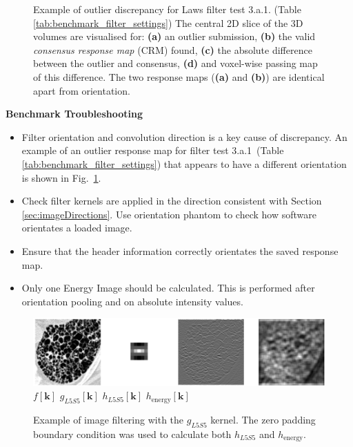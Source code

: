 \documentclass[fleqn,a4paper,oneside,openany]{book}
\begin{document}
\begin{figure}[!t]
\begin{minipage}[b]{0.45\textwidth}
   \end{minipage} 
   \caption{Example of outlier discrepancy for Laws filter test 3.a.1. (Table \ref{tab:benchmark_filter_settings}) The central 2D slice of the 3D volumes are visualised for: \textbf{(a)} an outlier submission, \textbf{(b)} the valid \textit{consensus response map} (CRM) found, \textbf{(c)} the absolute difference between the outlier and consensus,  \textbf{(d)} and voxel-wise passing map of this difference. The two response maps (\textbf{(a)} and \textbf{(b)}) are identical apart from orientation. }
   \label{fig:3a1_Laws_example}
\end{figure}


\vspace{2mm}
\begin{tcolorbox}[width=150mm, halign=left, colframe=black, colback=white, boxsep=0mm,arc=3mm]
\textbf{Benchmark Troubleshooting}
\begin{itemize}
\item Filter orientation and convolution direction is a key cause of discrepancy. %
An example of an outlier response map for filter test 3.a.1\ (Table \ref{tab:benchmark_filter_settings}) that appears to have a different orientation is shown in Fig.\ \ref{fig:3a1_Laws_example}.
\item Check filter kernels are applied in the direction consistent with Section \ref{sec:imageDirections}. Use orientation phantom to check how software orientates a loaded image. 
\item Ensure that the header information correctly orientates the saved response map.
\item Only one Energy Image should be calculated. This is performed after orientation pooling and on absolute intensity values.
\end{itemize}
\end{tcolorbox}




%
\begin{figure}
\centering
\includegraphics[trim = 0 0 0 0, clip, width=\linewidth]{Laws_example.png}\\
$f[\boldsymbol{k}]$
\hspace{2.5cm}
$g_{L5S5}[\boldsymbol{k}]$
\hspace{2.1cm}
$h_{L5S5}[\boldsymbol{k}]$
\hspace{2.3cm}
$h_{\text{energy}}[\boldsymbol{k}]$
\caption{Example of image filtering with the $g_{L5S5}$ kernel. The zero padding boundary condition was used to calculate both $h_{L5S5}$ and $h_{\text{energy}}$.}
  \label{fig:LawsExample}
\end{figure}
%
\end{document}
